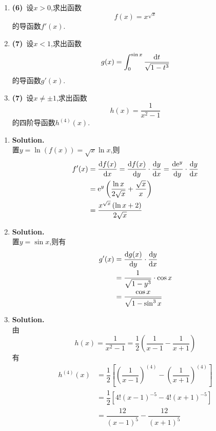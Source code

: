\documentclass{ctexart}
\begin{document}
\begin{problem}[2.(20\songti{分})]
    \begin{enumerate}[label=\textbf{(\arabic*)},leftmargin=*]
        \item \textbf{(6)}\ 设$x>0$,求出函数$$f(x)=x^{\sqrt{x}}$$的导函数$f'(x)$.
        \item \textbf{(7)}\ 设$x<1$,求出函数$$g(x)=\int_0^{\sin x}\dfrac{\mathrm{d} t}{\sqrt{1-t^3}}$$的导函数$g'(x)$.
        \item \textbf{(7)}\ 设$x\neq\pm 1$,求出函数$$h(x)=\dfrac{1}{x^2-1}$$的四阶导函数$h^{(4)}(x)$.
    \end{enumerate}
\end{problem}
\begin{solution}[Solution.]
    \begin{enumerate}[label=\textbf{(\arabic*)},leftmargin=*]
        \item \textbf{Solution.}\\
            置$y=\ln(f(x))=\sqrt{x}\ln x$,则
            \begin{align*}
                f'(x)
                &= \dfrac{\mathrm{d} f(x)}{\mathrm{d} x}=\dfrac{\mathrm{d} f(x)}{\mathrm{d} y}\cdot\dfrac{\mathrm{d} y}{\mathrm{d} x}=\dfrac{\mathrm{d} \mathrm{e}^y}{\mathrm{d} y}\cdot\dfrac{\mathrm{d} y}{\mathrm{d} x} \\
                &= \mathrm{e}^y\left(\dfrac{\ln x}{2\sqrt{x}}+\dfrac{\sqrt{x}}{x}\right) \\
                &= \dfrac{x^{\sqrt{x}}\left(\ln x+2\right)}{2\sqrt{x}}
            \end{align*}
        \item \textbf{Solution.}\\
            置$y=\sin x$,则有
            \begin{align*}
                g'(x)
                &= \dfrac{\mathrm{d} g(x)}{\mathrm{d} y}\cdot\dfrac{\mathrm{d} y}{\mathrm{d} x} \\
                &= \dfrac{1}{\sqrt{1-y^3}}\cdot\cos x \\
                &= \dfrac{\cos x}{\sqrt{1-\sin^3 x}}
            \end{align*}
        \item \textbf{Solution.}\\
            由$$h(x)=\dfrac{1}{x^2-1}=\dfrac{1}{2}\left(\dfrac{1}{x-1}-\dfrac{1}{x+1}\right)$$
            有\begin{align*}
                h^{(4)}(x)
                &= \dfrac{1}{2}\left[\left(\dfrac{1}{x-1}\right)^{(4)}-\left(\dfrac{1}{x+1}\right)^{(4)}\right] \\
                &= \dfrac{1}{2}\left[4!\left(x-1\right)^{-5}-4!\left(x+1\right)^{-5}\right] \\
                &= \dfrac{12}{(x-1)^5}-\dfrac{12}{(x+1)^5}
            \end{align*}
    \end{enumerate}
\end{solution}
\end{document}
